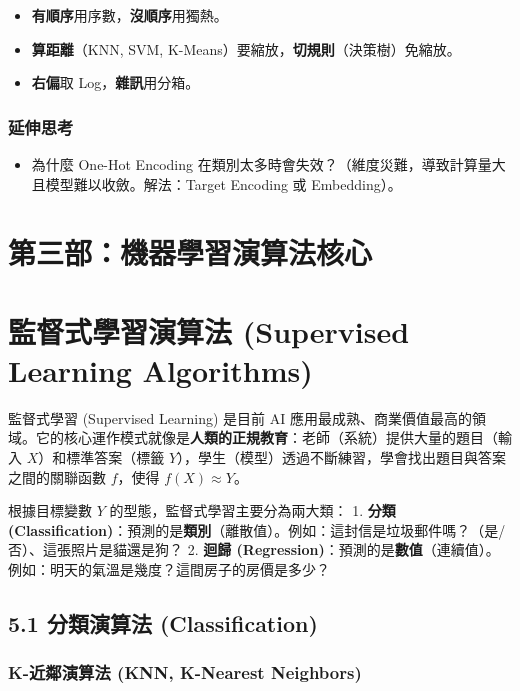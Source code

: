 \documentclass[
  letterpaper,
  DIV=11,
  numbers=noendperiod]{scrreprt}
\providecommand{\tightlist}{%
  \setlength{\itemsep}{0pt}\setlength{\parskip}{0pt}}
\begin{document}
\begin{itemize}
\tightlist
\item
  \textbf{有順序}用序數，\textbf{沒順序}用獨熱。
\item
  \textbf{算距離}（KNN, SVM,
  K-Means）要縮放，\textbf{切規則}（決策樹）免縮放。
\item
  \textbf{右偏}取 Log，\textbf{雜訊}用分箱。
\end{itemize}

\section{延伸思考}\label{ux5ef6ux4f38ux601dux8003-3}

\begin{itemize}
\tightlist
\item
  為什麼 One-Hot Encoding
  在類別太多時會失效？（維度災難，導致計算量大且模型難以收斂。解法：Target
  Encoding 或 Embedding）。
\end{itemize}

\part{第三部：機器學習演算法核心}

\part{監督式學習演算法 (Supervised Learning
Algorithms)}\label{ux76e3ux7763ux5f0fux5b78ux7fd2ux6f14ux7b97ux6cd5-supervised-learning-algorithms}

監督式學習 (Supervised Learning) 是目前 AI
應用最成熟、商業價值最高的領域。它的核心運作模式就像是\textbf{人類的正規教育}：老師（系統）提供大量的題目（輸入
\(X\)）和標準答案（標籤
\(Y\)），學生（模型）透過不斷練習，學會找出題目與答案之間的關聯函數
\(f\)，使得 \(f(X) \approx Y\)。

根據目標變數 \(Y\) 的型態，監督式學習主要分為兩大類： 1. \textbf{分類
(Classification)}：預測的是\textbf{類別}（離散值）。例如：這封信是垃圾郵件嗎？（是/否）、這張照片是貓還是狗？
2. \textbf{迴歸
(Regression)}：預測的是\textbf{數值}（連續值）。例如：明天的氣溫是幾度？這間房子的房價是多少？

\chapter{5.1 分類演算法 (Classification)}\label{sec-classification}

\section{K-近鄰演算法 (KNN, K-Nearest Neighbors)}\label{sec-knn}
\end{document}
